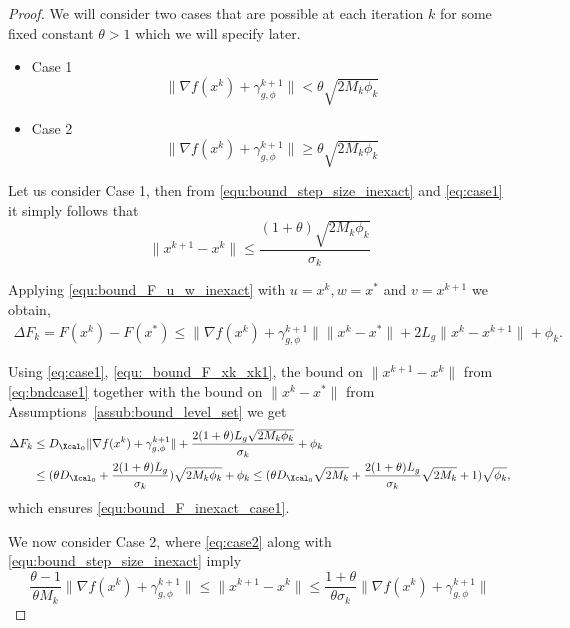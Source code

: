 \documentclass[11pt]{article}
\numberwithin{equation}{section}
\begin{document}
\begin{proof}	                
	We will consider two cases that are possible at each iteration $k$ for some fixed constant $\theta>1$ which we will specify later. 
	\begin{itemize}
	\item{Case 1} 
	\begin{equation}\label{eq:case1}
		\|  \nabla f(x^k) + \gamma_{g, \phi}^{k+1} \| < \theta\sqrt{2M_k\phi_k}
	\end{equation}

	\item{Case 2}
	\begin{equation}\label{eq:case2}
		\| \nabla f(x^k) + \gamma_{g, \phi}^{k+1} \| \geq \theta \sqrt{2M_k\phi_k}
	\end{equation}

	\end{itemize}

	Let us consider Case 1, then from \eqref{equ:bound_step_size_inexact}  and \eqref{eq:case1} it simply follows that
	\begin{equation}\label{eq:bndcase1} 
		\| x^{k+1} - x^k\|\leq \frac{(1+\theta)\sqrt{2M_k\phi_k}}{\sigma_k}
	\end{equation}

	Applying \eqref{equ:bound_F_u_w_inexact} with $u = x^k, w = x^*$ and $v = x^{k+1}$  we obtain,
	\begin{align}
	\label{equ:_bound_F_xk_xk1}
	    \Delta F_k = F(x^k) - F(x^*)
	    \leq \|\nabla f(x^k)+\gamma_{g, \phi}^{k+1}\|\|x^k-x^*\| + 2L_g \|x^k-x^{k+1}\| + \phi_k. 
	\end{align}

	Using \eqref{eq:case1}, \eqref{equ:_bound_F_xk_xk1}, the bound on  $\| x^{k+1} - x^k\|$ from \eqref{eq:bndcase1} together with the bound on $\|x^{k} - x^*\|$ from Assumptions~\ref{assub:bound_level_set} we get
	\begin{align}\label{eq:phi_k_replaced}
	    \Delta F_k
	    &\leq D_{\Xcal_0} \|\nabla f(x^k)+\gamma_{g, \phi}^{k+1}\| +  \frac{2(1+\theta)L_g\sqrt{2M_k\phi_k}}{\sigma_k} + \phi_k \\
	    \nonumber &\leq (\theta D_{\Xcal_0}+  \frac{2(1+\theta)L_g}{\sigma_k})\sqrt{2M_k\phi_k} + \phi_k 
	    \leq (\theta D_{\Xcal_0}\sqrt{2M_k}+  \frac{2(1+\theta)L_g}{\sigma_k}\sqrt{2M_k} + 1) \sqrt{\phi_k},
	\end{align}
	  which ensures \eqref{equ:bound_F_inexact_case1}. 
	  
	We now consider Case 2, where \eqref{eq:case2} along with \eqref{equ:bound_step_size_inexact} imply
	\begin{equation}\label{eq:bndcase2} 
		\frac{\theta-1}{\theta M_k}\| \nabla f(x^k) + \gamma_{g, \phi}^{k+1} \| \leq \| x^{k+1} - x^k\|\leq \frac{1+\theta}{\theta\sigma_k}\| \nabla f(x^k) + \gamma_{g, \phi}^{k+1} \|
	\end{equation}


\end{proof}
\end{document}
